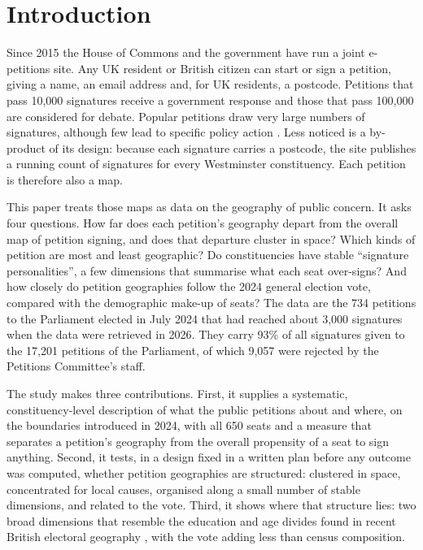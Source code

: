 \documentclass[11pt,a4paper]{article}
\begin{document}
\section{Introduction}\label{sec:intro}
Since 2015 the House of Commons and the government have run a joint e-petitions site. Any UK resident or British citizen can start or sign a petition, giving a name, an email address and, for UK residents, a postcode. Petitions that pass 10,000 signatures receive a government response and those that pass 100,000 are considered for debate. Popular petitions draw very large numbers of signatures, although few lead to specific policy action \citep{lestonbandeira2019,asher2019}. Less noticed is a by-product of its design: because each signature carries a postcode, the site publishes a running count of signatures for every Westminster constituency. Each petition is therefore also a map.

This paper treats those maps as data on the geography of public concern. It asks four questions. How far does each petition's geography depart from the overall map of petition signing, and does that departure cluster in space? Which kinds of petition are most and least geographic? Do constituencies have stable ``signature personalities'', a few dimensions that summarise what each seat over-signs? And how closely do petition geographies follow the 2024 general election vote, compared with the demographic make-up of seats? The data are the 734 petitions to the Parliament elected in July 2024 that had reached about 3,000 signatures when the data were retrieved in 2026. They carry 93\% of all signatures given to the 17,201 petitions of the Parliament, of which 9,057 were rejected by the Petitions Committee's staff.

The study makes three contributions. First, it supplies a systematic, constituency-level description of what the public petitions about and where, on the boundaries introduced in 2024, with all 650 seats and a measure that separates a petition's geography from the overall propensity of a seat to sign anything. Second, it tests, in a design fixed in a written plan before any outcome was computed, whether petition geographies are structured: clustered in space, concentrated for local causes, organised along a small number of stable dimensions, and related to the vote. Third, it shows where that structure lies: two broad dimensions that resemble the education and age divides found in recent British electoral geography \citep{jenningsstoker2016,goodwinheath2016}, with the vote adding less than census composition.
\end{document}
